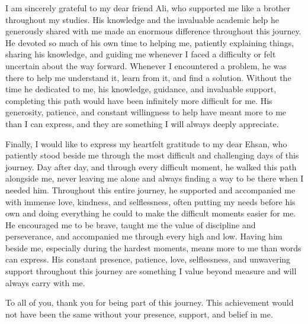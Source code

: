 I am sincerely grateful to my dear friend Ali, who supported me like a brother throughout my studies. His knowledge and the invaluable academic help he generously shared with me made an enormous difference throughout this journey. He devoted so much of his own time to helping me, patiently explaining things, sharing his knowledge, and guiding me whenever I faced a difficulty or felt uncertain about the way forward. Whenever I encountered a problem, he was there to help me understand it, learn from it, and find a solution. Without the time he dedicated to me, his knowledge, guidance, and invaluable support, completing this path would have been infinitely more difficult for me. His generosity, patience, and constant willingness to help have meant more to me than I can express, and they are something I will always deeply appreciate.

Finally, I would like to express my heartfelt gratitude to my dear Ehsan, who patiently stood beside me through the most difficult and challenging days of this journey. Day after day, and through every difficult moment, he walked this path alongside me, never leaving me alone and always finding a way to be there when I needed him. Throughout this entire journey, he supported and accompanied me with immense love, kindness, and selflessness, often putting my needs before his own and doing everything he could to make the difficult moments easier for me. He encouraged me to be brave, taught me the value of discipline and perseverance, and accompanied me through every high and low. Having him beside me, especially during the hardest moments, means more to me than words can express. His constant presence, patience, love, selflessness, and unwavering support throughout this journey are something I value beyond measure and will always carry with me.

To all of you, thank you for being part of this journey. This achievement would not have been the same without your presence, support, and belief in me.
